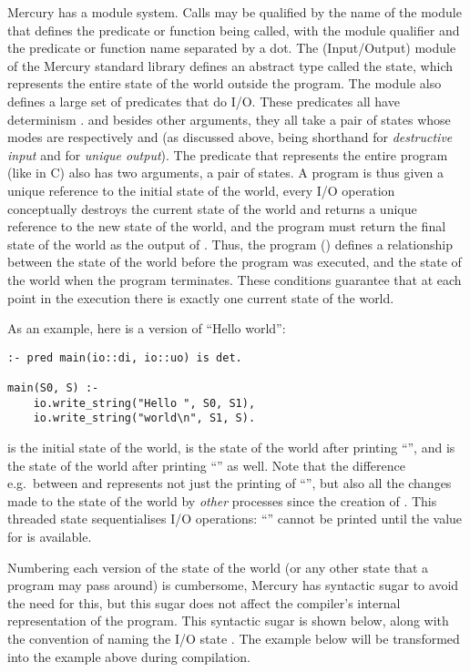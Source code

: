 Mercury has a module system.
Calls may be qualified by the name of the module
that defines the predicate or function being called,
with the module qualifier and the predicate or function name
separated by a dot.
The \io (Input/Output) module of the Mercury standard library
defines an abstract type called the \io state,
which represents the entire state of the world outside the program.
The \io module also defines a large set of predicates that do I/O.
These predicates all have determinism .
and besides other arguments,
they all take a pair of \io states
whose modes are respectively \di and \uo
(as discussed above, \di being shorthand for \emph{destructive input}
and \uo for \emph{unique output}).
The  predicate that represents the entire program
(like  in C)
also has two arguments, a  pair of \io states.
A program is thus given
a unique reference to the initial state of the world,
every I/O operation conceptually destroys the current state of the world
and returns a unique reference to the new state of the world,
and the program must return the final state of the world
as the output of .
Thus, the program () defines a relationship between the state
of the world before the program was executed,
and the state of the world when the program terminates.
These conditions guarantee that at each point in the execution
there is exactly one current state of the world.

As an example, here is a version of ``Hello world'':

\begin{verbatim}
:- pred main(io::di, io::uo) is det.

main(S0, S) :-
    io.write_string("Hello ", S0, S1),
    io.write_string("world\n", S1, S).
\end{verbatim}

\noindent
 is the initial state of the world,
 is the state of the world after printing ``'',
and  is the state of the world
after printing ``'' as well.
Note that the difference e.g.\ between  and 
represents not just the printing of ``'',
but also all the changes made to the state of the world
by \emph{other} processes since the creation of .
This threaded state sequentialises I/O operations:
``'' cannot be printed until the value for 
is available.

Numbering each version of the state of the world
(or any other state that a program may pass around) is cumbersome,
Mercury has syntactic sugar to avoid the need for this,
but this sugar does not affect
the compiler's internal representation of the program.
This syntactic sugar is shown below, along with the convention of naming
the I/O state .
The example below will be transformed into the example above during
compilation.

